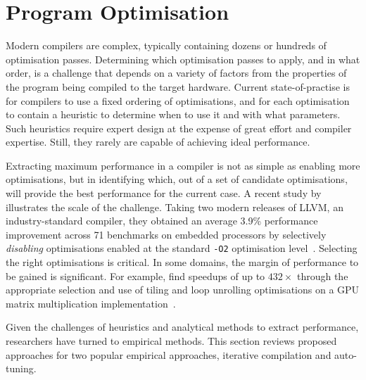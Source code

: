 \section{Program Optimisation}
\label{sec:related-work-optimisation}

Modern compilers are complex, typically containing dozens or hundreds of optimisation passes. Determining which optimisation passes to apply, and in what order, is a challenge that depends on a variety of factors from the properties of the program being compiled to the target hardware. Current state-of-practise is for compilers to use a fixed ordering of optimisations, and for each optimisation to contain a heuristic to determine when to use it and with what parameters. Such heuristics require expert design at the expense of great effort and compiler expertise. Still, they rarely are capable of achieving ideal performance.

Extracting maximum performance in a compiler is not as simple as enabling more optimisations, but in identifying which, out of a set of candidate optimisations, will provide the best performance for the current case. A recent study by \citeauthor{Georgiou2018} illustrates the scale of the challenge. Taking two modern releases of LLVM, an industry-standard compiler, they obtained an average 3.9\% performance improvement across 71 benchmarks on embedded processors by selectively \emph{disabling} optimisations enabled at the standard \texttt{-O2} optimisation level~\cite{Georgiou2018}.
Selecting the right optimisations is critical. In some domains, the margin of performance to be gained is significant. For example, \citeauthor{Ryoo2008a} find speedups of up to $432\times$ through the appropriate selection and use of tiling and loop unrolling optimisations on a GPU matrix multiplication implementation~\cite{Ryoo2008a}.

Given the challenges of heuristics and analytical methods to extract performance, researchers have turned to empirical methods. This section reviews proposed approaches for two popular empirical approaches, iterative compilation and auto-tuning.


